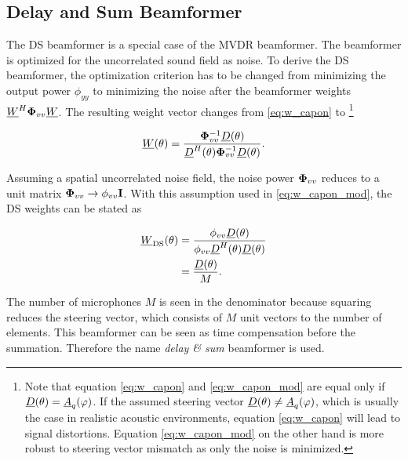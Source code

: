 \subsection{Delay and Sum Beamformer}
\label{subsec:DS}
The \ac{DS} beamformer is a special case of the \ac{MVDR} beamformer.
The beamformer is optimized for the uncorrelated sound field as noise.
To derive the \ac{DS} beamformer, the optimization criterion has to be changed from minimizing the output power $\phi_{yy}$ to minimizing the noise after the beamformer weights $\underline{W}^H\mathbf{\Phi}_{vv}\underline{W}$.
The resulting weight vector changes from \ref{eq:w_capon} to \footnote{Note that equation \ref{eq:w_capon} and \ref{eq:w_capon_mod} are equal only if $\underline{D}(\theta) = \underline{A}_q(\varphi)$. If the assumed steering vector $\underline{D}(\theta) \neq \underline{A}_q(\varphi)$, which is usually the case in realistic acoustic environments, equation \ref{eq:w_capon} will lead to signal distortions. Equation \ref{eq:w_capon_mod} on the other hand is more robust to steering vector mismatch as only the noise is minimized.}

\begin{equation}
\underline{W}(\theta) = \frac{\mathbf{\Phi}_{vv}^{-1} \underline{D}(\theta) } { \underline{D}^H(\theta) \mathbf{\Phi}_{vv}^{-1} \underline{D}(\theta) }. \label{eq:w_capon_mod}
\end{equation}

Assuming a spatial uncorrelated noise field, the noise power $\mathbf{\Phi}_{vv}$ reduces to a unit matrix $\mathbf{\Phi}_{vv} \rightarrow \phi_{vv} \mathbf{I}$. With this assumption used in \ref{eq:w_capon_mod}, the \ac{DS} weights can be stated as

\begin{equation}
\begin{split}
\underline{W}_\text{DS}(\theta) &= \frac{\phi_{vv} \underline{D}(\theta) } {\phi_{vv} \underline{D}^H(\theta)\underline{D}(\theta)  }\\
&= \frac{\underline{D}(\theta)}{M}. \label{eq:w_ds}
\end{split}
\end{equation}

The number of microphones $M$ is seen in the denominator because squaring reduces the steering vector, which consists of $M$ unit vectors to the number of elements. This beamformer can be seen as time compensation before the summation. Therefore the name \emph{delay \& sum} beamformer is used. \cite[Chapter~2]{brandstein2013microphone}

